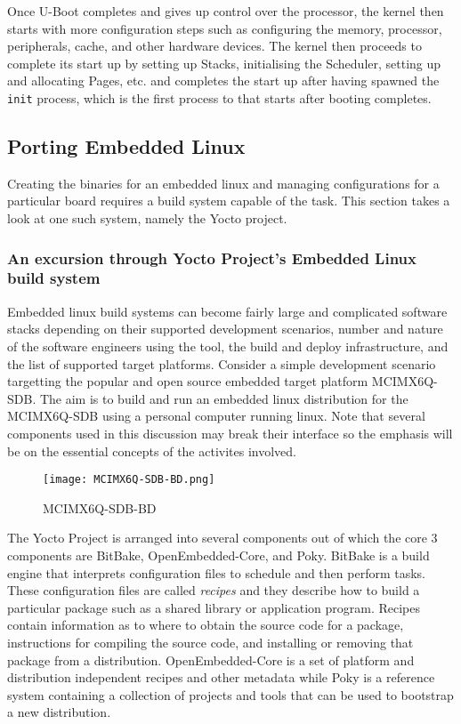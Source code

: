 Once U-Boot completes and gives up control over the processor, the kernel then starts with more configuration steps such as configuring the memory, processor, peripherals, cache, and other hardware devices. The kernel then proceeds to complete its start up by setting up Stacks, initialising the Scheduler, setting up and allocating Pages, etc. and completes the start up after having spawned the \texttt{init} process, which is the first process to that starts after booting completes.


\subsection{Porting Embedded Linux}

Creating the binaries for an embedded linux and managing configurations for a particular board requires a build system capable of the task. This section takes a look at one such system, namely the Yocto project.

\subsubsection{An excursion through Yocto Project's Embedded Linux build system}
\label{section:yocto-demo}

Embedded linux build systems can become fairly large and complicated software stacks depending on their supported development scenarios, number and nature of the software engineers using the tool, the build and deploy infrastructure, and the list of supported target platforms. Consider a simple development scenario targetting the popular and open source embedded target platform MCIMX6Q-SDB. The aim is to build and run an embedded linux distribution for the MCIMX6Q-SDB using a personal computer running linux. Note that several components used in this discussion may break their interface so the emphasis will be on the essential concepts of the activites involved.

\begin{figure}[h]
	\centering
	\texttt{[image: MCIMX6Q-SDB-BD.png]}
	\caption{MCIMX6Q-SDB-BD}
	\label{fig:mcimx6q-sdb}
\end{figure}

The Yocto Project is arranged into several components out of which the core 3 components are BitBake, OpenEmbedded-Core, and Poky. BitBake is a build engine that interprets configuration files to schedule and then perform tasks. These configuration files are called \textit{recipes} and they describe how to build a particular package such as a shared library or application program. Recipes contain information as to where to obtain the source code for a package, instructions for compiling the source code, and installing or removing that package from a distribution. OpenEmbedded-Core is a set of platform and distribution independent recipes and other metadata while Poky is a reference system containing a collection of projects and tools that can be used to bootstrap a new distribution.

